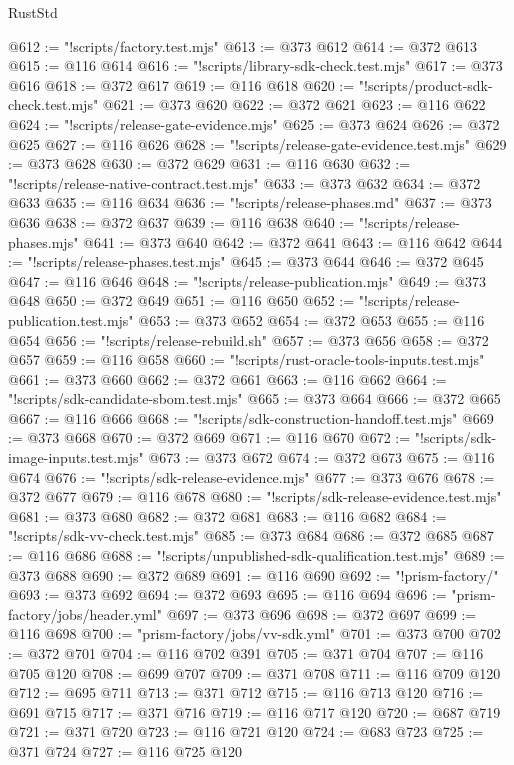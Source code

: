 \begin{lexlean}{RustStd}
\begin{coremodule}
@612 := "!scripts/factory.test.mjs"
@613 := @373 @612
@614 := @372 @613
@615 := @116 @614
@616 := "!scripts/library-sdk-check.test.mjs"
@617 := @373 @616
@618 := @372 @617
@619 := @116 @618
@620 := "!scripts/product-sdk-check.test.mjs"
@621 := @373 @620
@622 := @372 @621
@623 := @116 @622
@624 := "!scripts/release-gate-evidence.mjs"
@625 := @373 @624
@626 := @372 @625
@627 := @116 @626
@628 := "!scripts/release-gate-evidence.test.mjs"
@629 := @373 @628
@630 := @372 @629
@631 := @116 @630
@632 := "!scripts/release-native-contract.test.mjs"
@633 := @373 @632
@634 := @372 @633
@635 := @116 @634
@636 := "!scripts/release-phases.md"
@637 := @373 @636
@638 := @372 @637
@639 := @116 @638
@640 := "!scripts/release-phases.mjs"
@641 := @373 @640
@642 := @372 @641
@643 := @116 @642
@644 := "!scripts/release-phases.test.mjs"
@645 := @373 @644
@646 := @372 @645
@647 := @116 @646
@648 := "!scripts/release-publication.mjs"
@649 := @373 @648
@650 := @372 @649
@651 := @116 @650
@652 := "!scripts/release-publication.test.mjs"
@653 := @373 @652
@654 := @372 @653
@655 := @116 @654
@656 := "!scripts/release-rebuild.sh"
@657 := @373 @656
@658 := @372 @657
@659 := @116 @658
@660 := "!scripts/rust-oracle-tools-inputs.test.mjs"
@661 := @373 @660
@662 := @372 @661
@663 := @116 @662
@664 := "!scripts/sdk-candidate-sbom.test.mjs"
@665 := @373 @664
@666 := @372 @665
@667 := @116 @666
@668 := "!scripts/sdk-construction-handoff.test.mjs"
@669 := @373 @668
@670 := @372 @669
@671 := @116 @670
@672 := "!scripts/sdk-image-inputs.test.mjs"
@673 := @373 @672
@674 := @372 @673
@675 := @116 @674
@676 := "!scripts/sdk-release-evidence.mjs"
@677 := @373 @676
@678 := @372 @677
@679 := @116 @678
@680 := "!scripts/sdk-release-evidence.test.mjs"
@681 := @373 @680
@682 := @372 @681
@683 := @116 @682
@684 := "!scripts/sdk-vv-check.test.mjs"
@685 := @373 @684
@686 := @372 @685
@687 := @116 @686
@688 := "!scripts/unpublished-sdk-qualification.test.mjs"
@689 := @373 @688
@690 := @372 @689
@691 := @116 @690
@692 := "!prism-factory/"
@693 := @373 @692
@694 := @372 @693
@695 := @116 @694
@696 := "prism-factory/jobs/header.yml"
@697 := @373 @696
@698 := @372 @697
@699 := @116 @698
@700 := "prism-factory/jobs/vv-sdk.yml"
@701 := @373 @700
@702 := @372 @701
@704 := @116 @702 @391
@705 := @371 @704
@707 := @116 @705 @120
@708 := @699 @707
@709 := @371 @708
@711 := @116 @709 @120
@712 := @695 @711
@713 := @371 @712
@715 := @116 @713 @120
@716 := @691 @715
@717 := @371 @716
@719 := @116 @717 @120
@720 := @687 @719
@721 := @371 @720
@723 := @116 @721 @120
@724 := @683 @723
@725 := @371 @724
@727 := @116 @725 @120

\end{coremodule}
\end{lexlean}
